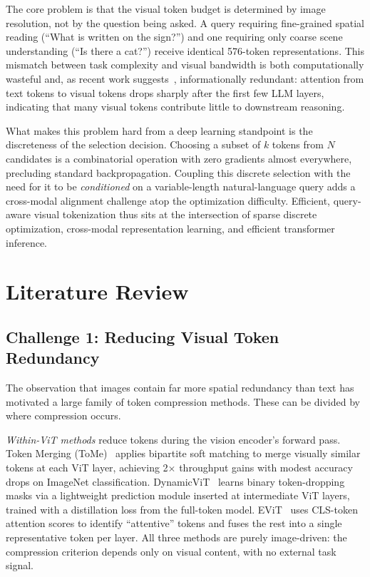 \documentclass[11pt,twocolumn]{article}
\begin{document}
The core problem is that the visual token budget is determined by image resolution, not by the question being asked. A query requiring fine-grained spatial reading (``What is written on the sign?'') and one requiring only coarse scene understanding (``Is there a cat?'') receive identical 576-token representations. This mismatch between task complexity and visual bandwidth is both computationally wasteful and, as recent work suggests~\cite{chen2024fastv}, informationally redundant: attention from text tokens to visual tokens drops sharply after the first few LLM layers, indicating that many visual tokens contribute little to downstream reasoning.

What makes this problem hard from a deep learning standpoint is the discreteness of the selection decision. Choosing a subset of $k$ tokens from $N$ candidates is a combinatorial operation with zero gradients almost everywhere, precluding standard backpropagation. Coupling this discrete selection with the need for it to be \emph{conditioned} on a variable-length natural-language query adds a cross-modal alignment challenge atop the optimization difficulty. Efficient, query-aware visual tokenization thus sits at the intersection of sparse discrete optimization, cross-modal representation learning, and efficient transformer inference.

\section{Literature Review}
\label{sec:litreview}

\subsection{Challenge 1: Reducing Visual Token Redundancy}

The observation that images contain far more spatial redundancy than text has motivated a large family of token compression methods. These can be divided by where compression occurs.

\emph{Within-ViT methods} reduce tokens during the vision encoder's forward pass. Token Merging (ToMe)~\cite{bolya2022token} applies bipartite soft matching to merge visually similar tokens at each ViT layer, achieving 2$\times$ throughput gains with modest accuracy drops on ImageNet classification. DynamicViT~\cite{rao2021dynamicvit} learns binary token-dropping masks via a lightweight prediction module inserted at intermediate ViT layers, trained with a distillation loss from the full-token model. EViT~\cite{liang2022evit} uses CLS-token attention scores to identify ``attentive'' tokens and fuses the rest into a single representative token per layer. All three methods are purely image-driven: the compression criterion depends only on visual content, with no external task signal.
\end{document}
